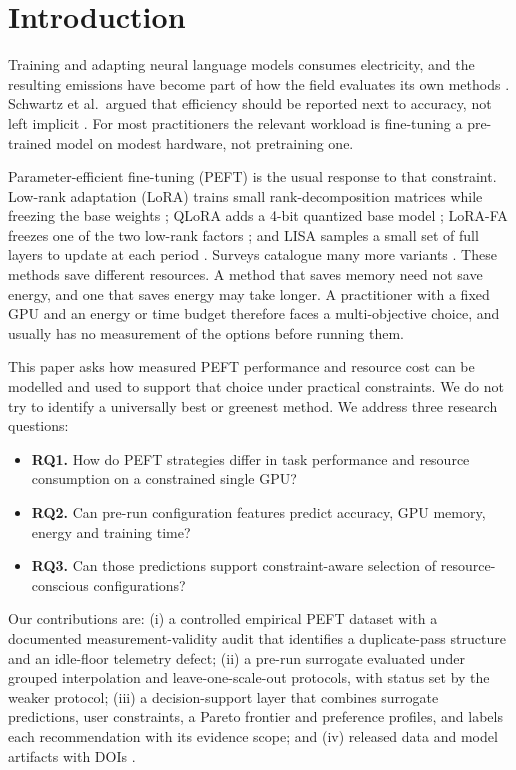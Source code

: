 \documentclass[conference]{IEEEtran}
\begin{document}
\section{Introduction}

Training and adapting neural language models consumes electricity, and the resulting
emissions have become part of how the field evaluates its own methods
\cite{strubell2019energy,schwartz2020greenai,henderson2020reporting,patterson2021carbon}.
Schwartz et al.\ argued that efficiency should be reported next to accuracy, not left
implicit \cite{schwartz2020greenai}. For most practitioners the relevant workload is
fine-tuning a pre-trained model on modest hardware, not pretraining one.

Parameter-efficient fine-tuning (PEFT) is the usual response to that constraint. Low-rank
adaptation (LoRA) trains small rank-decomposition matrices while freezing the base weights
\cite{hu2022lora}; QLoRA adds a 4-bit quantized base model \cite{dettmers2023qlora}; LoRA-FA
freezes one of the two low-rank factors \cite{zhang2023lorafa}; and LISA samples a small set
of full layers to update at each period \cite{pan2024lisa}. Surveys catalogue many more
variants \cite{han2024peftsurvey}. These methods save different resources. A method that
saves memory need not save energy, and one that saves energy may take longer. A practitioner
with a fixed GPU and an energy or time budget therefore faces a multi-objective choice, and
usually has no measurement of the options before running them.

This paper asks how measured PEFT performance and resource cost can be modelled and used to
support that choice under practical constraints. We do not try to identify a universally
best or greenest method. We address three research questions:

\begin{itemize}
\item \textbf{RQ1.} How do PEFT strategies differ in task performance and resource
consumption on a constrained single GPU?
\item \textbf{RQ2.} Can pre-run configuration features predict accuracy, GPU memory, energy
and training time?
\item \textbf{RQ3.} Can those predictions support constraint-aware selection of
resource-conscious configurations?
\end{itemize}

Our contributions are:
(i) a controlled empirical PEFT dataset with a documented measurement-validity audit that
identifies a duplicate-pass structure and an idle-floor telemetry defect;
(ii) a pre-run surrogate evaluated under grouped interpolation and leave-one-scale-out
protocols, with status set by the weaker protocol;
(iii) a decision-support layer that combines surrogate predictions, user constraints, a
Pareto frontier and preference profiles, and labels each recommendation with its evidence
scope; and
(iv) released data and model artifacts with DOIs \cite{tanzil2026data,tanzil2026model}.
\end{document}
